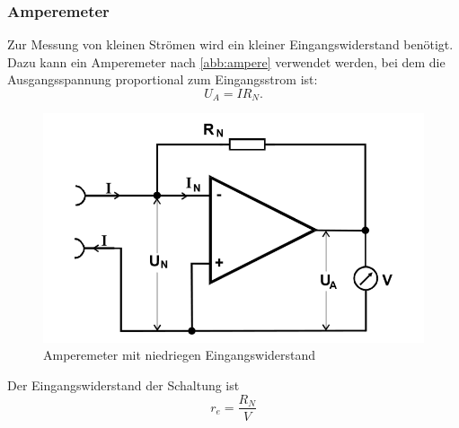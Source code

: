 \subsubsection{Amperemeter}
Zur Messung von kleinen Strömen wird ein kleiner Eingangswiderstand benötigt. Dazu kann ein Amperemeter nach \autoref{abb:ampere} verwendet werden, bei dem die Ausgangsspannung proportional zum Eingangsstrom ist:
\begin{equation}
U_A = IR_N.
\end{equation}
\begin{figure}[h!]
 	\centering
 	\includegraphics[width=\textwidth]{img/ampere.png}
 	\caption{Amperemeter mit niedriegen Eingangswiderstand \cite{FP}}
 	\label{abb:ampere}
\end{figure}
Der Eingangswiderstand der Schaltung ist
\begin{equation}
r_e = \frac{R_N}{V}
\end{equation}


